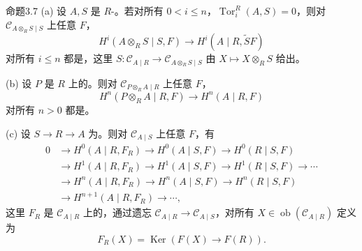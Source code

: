 \begin{SGAresult}{命题}{3.7}
(a) 设 $A,S$ 是 $R$-。若对所有 $0<i\leq n$，$\operatorname{Tor}_i^R(A,S)=0$，则对 $\mathcal C_{A\otimes_R S\mid S}$ 上任意 $F$，
\[H^i(A\otimes_R S\mid S,F)\longrightarrow H^i(A\mid R,\widetilde SF)\]
对所有 $i\leq n$ 都是，这里 $S:\mathcal C_{A\mid R}\to\mathcal C_{A\otimes_R S\mid S}$ 由 $X\mapsto X\otimes_R S$ 给出。

(b) 设 $P$ 是 $R$ 上的。则对 $\mathcal C_{P\otimes_R A\mid R}$ 上任意 $F$，
\[H^n(P\otimes_R A\mid R,F)\longrightarrow H^n(A\mid R,F)\]
对所有 $n>0$ 都是。

(c) 设 $S\to R\to A$ 为。则对 $\mathcal C_{A\mid S}$ 上任意 $F$，有
\[
\begin{aligned}
0&\to H^0(A\mid R,F_R)\to H^0(A\mid S,F)\to H^0(R\mid S,F)\\
&\to H^1(A\mid R,F_R)\to H^1(A\mid S,F)\to H^1(R\mid S,F)\to\cdots\\
&\to H^n(A\mid R,F_R)\to H^n(A\mid S,F)\to H^n(R\mid S,F)\\
&\to H^{n+1}(A\mid R,F_R)\to\cdots,
\end{aligned}
\]
这里 $F_R$ 是 $\mathcal C_{A\mid R}$ 上的，通过遗忘 $\mathcal C_{A\mid R}\to\mathcal C_{A\mid S}$，对所有 $X\in\operatorname{ob}(\mathcal C_{A\mid R})$ 定义为
\[F_R(X)=\operatorname{Ker}(F(X)\to F(R)).\]
\end{SGAresult}
